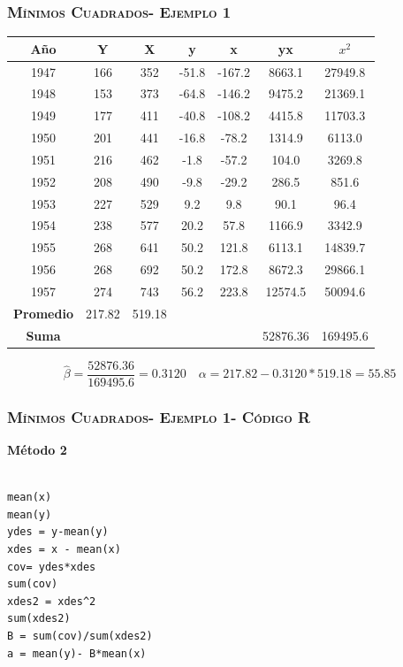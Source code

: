 \documentclass[16.5pt]{beamer}
\begin{document}
{
\begin{frame}
\frametitle{\textsc{Mínimos Cuadrados- Ejemplo 1}}
\hspace*{-5mm}
\vspace*{-5mm} 


\begin{center}
\begin{tabular}{| c |c |c| c| c|c|c|}
\hline%
  \textbf{Año} & \textbf{Y} & \textbf{X } & \textbf{y} & \textbf{x} & \textbf{yx} & \textbf{$x^2$}
 \tabularnewline
\hline
1947 & 166 &  352 & -51.8 & -167.2 & 8663.1 & 27949.8  \\
1948 & 153 & 373 & -64.8 & -146.2 & 9475.2 & 21369.1\\
1949 & 177 & 411 & -40.8 & -108.2 & 4415.8  & 11703.3 \\
1950 & 201 & 441 & -16.8 & -78.2 & 1314.9 & 6113.0 \\
1951 & 216 & 462 & -1.8 & -57.2 & 104.0 & 3269.8 \\
1952 & 208 & 490 & -9.8 & -29.2 & 286.5 & 851.6 \\
1953 & 227 & 529 & 9.2 &  9.8 & 90.1 & 96.4 \\
1954 & 238 & 577 & 20.2 & 57.8 & 1166.9  & 3342.9 \\
1955 & 268 & 641 & 50.2 & 121.8 & 6113.1 & 14839.7 \\
1956 & 268 & 692 &  50.2 & 172.8 & 8672.3  & 29866.1 \\
1957 & 274 & 743 & 56.2  & 223.8 & 12574.5  & 50094.6 \\
\hline
\textbf{Promedio} & 217.82 & 519.18 & & & & \\
\hline
\textbf{Suma} & &  & & & 52876.36 & 169495.6  \\
\hline

\end{tabular}
\end{center}

$$\hat\beta =  \frac{52876.36}{169495.6} = 0.3120 \quad \alpha = 217.82 - 0.3120*519.18= 55.85 $$
\end{frame}
}

{
\begin{frame}
\frametitle{\textsc{Mínimos Cuadrados- Ejemplo 1- Código R}}

\textbf{Método 2}
\begin{lstlisting}

mean(x)
mean(y)
ydes = y-mean(y)
xdes = x - mean(x)
cov= ydes*xdes
sum(cov)
xdes2 = xdes^2
sum(xdes2)
B = sum(cov)/sum(xdes2)
a = mean(y)- B*mean(x)


\end{lstlisting}

\end{frame}
}
\end{document}
